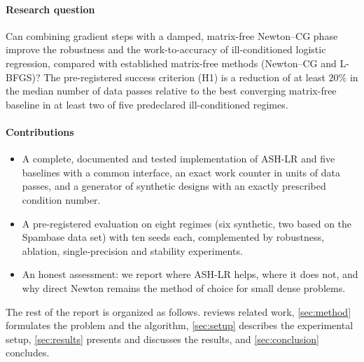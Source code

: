 \paragraph{Research question} Can combining gradient steps with a damped,
matrix-free Newton--CG phase improve the robustness and the work-to-accuracy of
ill-conditioned logistic regression, compared with established matrix-free
methods (Newton--CG and L-BFGS)? The pre-registered success criterion (H1) is a
reduction of at least $20\%$ in the median number of data passes relative to the
best converging matrix-free baseline in at least two of five predeclared
ill-conditioned regimes.

\paragraph{Contributions}
\begin{itemize}
  \item A complete, documented and tested implementation of ASH-LR and five
  baselines with a common interface, an exact work counter in units of data passes,
  and a generator of synthetic designs with an exactly prescribed condition number.
  \item A pre-registered evaluation on eight regimes (six synthetic, two based on the
  Spambase data set) with ten seeds each, complemented by robustness, ablation,
  single-precision and stability experiments.
  \item An honest assessment: we report where ASH-LR helps, where it does not, and
  why direct Newton remains the method of choice for small dense problems.
\end{itemize}

The rest of the report is organized as follows.  reviews related
work, \cref{sec:method} formulates the problem and the algorithm,
\cref{sec:setup} describes the experimental setup, \cref{sec:results} presents and
discusses the results, and \cref{sec:conclusion} concludes.
